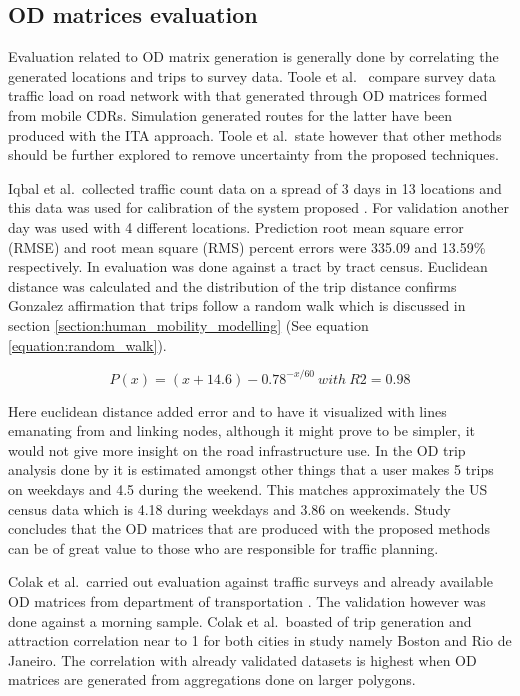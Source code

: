 \documentclass[12pt, a4paper]{report}
\theoremstyle{definition}
\theoremstyle{definition}%
\theoremstyle{definition}%
\theoremstyle{definition}%
\theoremstyle{definition}%
\theoremstyle{definition}%
\begin{document}
\subsection{OD matrices evaluation}

Evaluation related to OD matrix generation is generally done by correlating the generated locations and trips to survey data. Toole et al.\ \cite{Toole2015} compare survey data traffic load on road network with that generated through OD matrices formed from mobile CDRs. Simulation generated routes for the latter have been produced with the ITA approach. Toole et al.\ state however that other methods should be further explored to remove uncertainty from the proposed techniques.

Iqbal et al.\ collected traffic count data on a spread of 3 days in 13 locations and this data was used for calibration of the system proposed \cite{Iqbal2014}.  For validation another day was used with 4 different locations. Prediction root mean square error (RMSE) and root mean square (RMS) percent errors were 335.09 and 13.59\% respectively. In \cite{Calabrese2011} evaluation was done against a tract by tract census. Euclidean distance was calculated and the distribution of the trip distance confirms Gonzalez affirmation that trips follow a random walk \cite{Gonzalez2008} which is discussed in section \ref{section:human_mobility_modelling}  (See equation \ref{equation:random_walk}).

\begin{equation}\label{equation:random_walk}
P(x) = (x+14.6)-0.78^{-x/60}~ with~ R2 = 0.98 
\end{equation}

Here euclidean distance added error and to have it visualized with lines emanating from and linking nodes, although it might prove to be simpler, it would not give more insight on the road infrastructure use. In the OD trip analysis done by \cite{Calabrese2011} it is estimated amongst other things that a user makes 5 trips on weekdays and 4.5 during the weekend. This matches approximately the US census data which is 4.18 during weekdays and 3.86 on weekends. Study concludes that the OD matrices that are produced with the proposed methods can be of great value to those who are responsible for traffic planning.

Colak et al.\ carried out evaluation against traffic surveys and already available OD matrices from department of transportation \cite{Colak2015}.  The validation however was done against a morning sample. Colak et al.\ boasted of trip generation and attraction correlation near to 1 for both cities in study namely Boston and Rio de Janeiro. The correlation with already validated datasets is highest when OD matrices are generated from aggregations done on larger polygons. 
\end{document}
